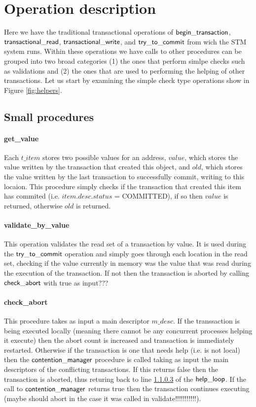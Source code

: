 \documentclass[runningheads,a4paper]{llncs}
\begin{document}
\section{Operation description}
Here we have the traditional transactional operations of ${\sf begin\_transaction}$, ${\sf transactional\_read}$, ${\sf transactional\_write}$,
and ${\sf try\_to\_commit}$ from wich the STM system runs.
Within these operations we have calls to other procedures can be grouped into two broad categories (1) the ones that perform simlpe checks such
as validations and (2) the ones that are used to performing the helping of other transactions.
Let us start by examining the simple check type operations show in Figure \ref{fig:helpers}.

\subsection{Small procedures}

\paragraph{get\_value}
Each $t\_item$ stores two possible values for an address,
$\mathit{value}$, which stores the value written by the transaction that created this object,
and $\mathit{old}$, which stores the value written by the last transaction to successfully commit, writing to this locaion.
This procedure simply checks if the transaction that created this item has commited (i.e. $\mathit{item.desc.status}$ = COMMITTED), if
so then $\mathit{value}$ is returned, otherwise $\mathit{old}$ is returned.

\paragraph{validate\_by\_value}
This operation validates the read set of a transaction by value.
It is used during the ${\sf try\_to\_commit}$ operation and simply goes through each location
in the read set, checking if the value currently in memory was the value that was read during the execution of the transaction.
If not then the transaction is aborted by calling ${\sf check\_abort}$ with true as input???

\paragraph{check\_abort}
This procedure takes as input a main descriptor $\mathit{m\_desc}$.
If the transsaction is being executed locally (meaning there cannot be any concurrent processes helping it execute)
then the abort count is increased and transaction is immediately restarted.
Otherwise if the transaction is one that needs help (i.e. is not local) then the ${\sf contention\_manager}$ procedure is called
taking as input the main descriptors of the conflicting transactions.
If this returns false then the transaction is aborted, thus returing back to line \ref{} of the ${\sf help\_loop}$.
If the call to ${\sf contention\_manager}$ returns true then the transaction continues executing (maybe should abort in the case it was called
in validate!!!!!!!!!!!).
\end{document}
